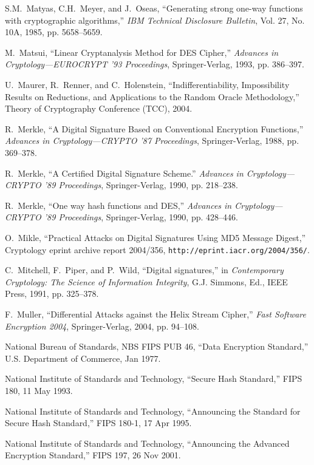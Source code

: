 \documentclass[11pt,twoside]{article}
\begin{document}
{\begin{thebibliography}{19}
 S.M.~Matyas, C.H.~Meyer, and J.~Oseas, ``Generating strong one-way functions with cryptographic algorithms,'' {\it IBM Technical Disclosure Bulletin}, Vol. 27, No. 10A, 1985, pp. 5658--5659.

 M.~Matsui, ``Linear Cryptanalysis Method for DES Cipher,'' {\it Advances in Cryptology---EUROCRYPT '93 Proceedings}, Springer-Verlag, 1993, pp. 386--397.

 U.~Maurer, R.~Renner, and C.~Holenstein, ``Indifferentiability, Impossibility Results on Reductions, and Applications to the Random Oracle Methodology,'' Theory of Cryptography Conference (TCC), 2004.

 R.~Merkle, ``A Digital Signature Based on Conventional Encryption Functions,'' {\it Advances in Cryptology---CRYPTO '87 Proceedings}, Springer-Verlag, 1988, pp. 369--378.

 R.~Merkle, ``A Certified Digital Signature Scheme.'' {\it Advances in Cryptology---CRYPTO '89 Proceedings}, Springer-Verlag, 1990, pp. 218--238.

 R.~Merkle, ``One way hash functions and DES,'' {\it Advances in Cryptology---CRYPTO '89 Proceedings}, Springer-Verlag, 1990, pp. 428--446.

 O.~Mikle, ``Practical Attacks on Digital Signatures Using MD5 Message Digest,'' Cryptology eprint archive report 2004/356, \texttt{http://eprint.iacr.org/2004/356/}.

 C.~Mitchell, F.~Piper, and P.~Wild, ``Digital
signatures,'' in {\it Contemporary Cryptology: The Science of Information Integrity}, G.J. Simmons, Ed., IEEE Press, 1991, pp. 325--378.

 F.~Muller, ``Differential Attacks against the Helix Stream Cipher,'' {\it Fast Software Encryption 2004}, Springer-Verlag, 2004, pp. 94--108.

 National Bureau of Standards, NBS FIPS PUB 46, ``Data Encryption Standard,'' U.S. Department of Commerce, Jan 1977.

 National Institute of Standards and Technology, ``Secure Hash Standard,'' FIPS 180, 11 May 1993.

 National Institute of Standards and Technology, ``Announcing the Standard for Secure Hash Standard,'' FIPS 180-1, 17 Apr 1995.

 National Institute of Standards and Technology, ``Announcing the Advanced Encryption Standard,'' FIPS 197, 26 Nov 2001.


\end{thebibliography}}
\end{document}
